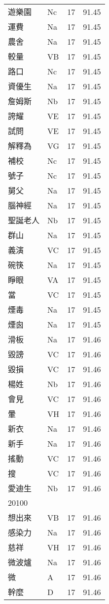 \documentclass[twocolumn]{book}
\begin{document}
\begin{supertabular}{llrr}
遊樂園 & Nc & 17 &  91.45\\
運費 & Na & 17 &  91.45\\
農舍 & Na & 17 &  91.45\\
較量 & VB & 17 &  91.45\\
路口 & Nc & 17 &  91.45\\
資優生 & Na & 17 &  91.45\\
詹姆斯 & Nb & 17 &  91.45\\
誇耀 & VE & 17 &  91.45\\
試問 & VE & 17 &  91.45\\
解釋為 & VG & 17 &  91.45\\
補校 & Nc & 17 &  91.45\\
號子 & Nc & 17 &  91.45\\
舅父 & Na & 17 &  91.45\\
腦神經 & Na & 17 &  91.45\\
聖誕老人 & Nb & 17 &  91.45\\
群山 & Na & 17 &  91.45\\
義演 & VC & 17 &  91.45\\
碗筷 & Na & 17 &  91.45\\
睜眼 & VA & 17 &  91.45\\
當 & VC & 17 &  91.45\\
煙毒 & Na & 17 &  91.45\\
煙囪 & Na & 17 &  91.45\\
滑板 & Na & 17 &  91.46\\
毀謗 & VC & 17 &  91.46\\
毀損 & VC & 17 &  91.46\\
楊姓 & Nb & 17 &  91.46\\
會見 & VC & 17 &  91.46\\
暈 & VH & 17 &  91.46\\
新衣 & Na & 17 &  91.46\\
新手 & Na & 17 &  91.46\\
搖動 & VC & 17 &  91.46\\
搜 & VC & 17 &  91.46\\
愛迪生 & Nb & 17 &  91.46\\
20100\\
想出來 & VB & 17 &  91.46\\
感染力 & Na & 17 &  91.46\\
慈祥 & VH & 17 &  91.46\\
微波爐 & Na & 17 &  91.46\\
微 & A & 17 &  91.46\\
幹麼 & D & 17 &  91.46\\

\end{supertabular}
\end{document}
